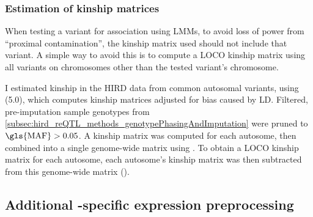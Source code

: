 \subsubsection{Estimation of kinship matrices}
\label{subsec:hird_reQTL_LDAK}

%
When testing a variant for association using \glspl{LMM}, to avoid loss of power from \enquote{proximal contamination}, the kinship matrix used should not include that variant\autocite{listgarten2012ImprovedLinearMixed}.
A simple way to avoid this is to compute a \gls{LOCO} kinship matrix using all variants on chromosomes other than the tested variant's chromosome\autocite{lippert2011FaSTLinearMixed}.

I estimated kinship in the \gls{HIRD} data from common autosomal variants, using  (5.0), which computes kinship matrices adjusted for bias caused by \gls{LD}\autocite{speed2012ImprovedHeritabilityEstimation}.
Filtered, pre-imputation sample genotypes from \cref{subsec:hird_reQTL_methods_genotypePhasingAndImputation} were pruned to $\text{\gls{MAF}} > 0.05$.
A kinship matrix was computed for each autosome, then combined into a single genome-wide matrix using .
To obtain a \gls{LOCO} kinship matrix for each autosome, each autosome's kinship matrix was then subtracted from this genome-wide matrix ().


\subsection{Additional -specific expression preprocessing}

